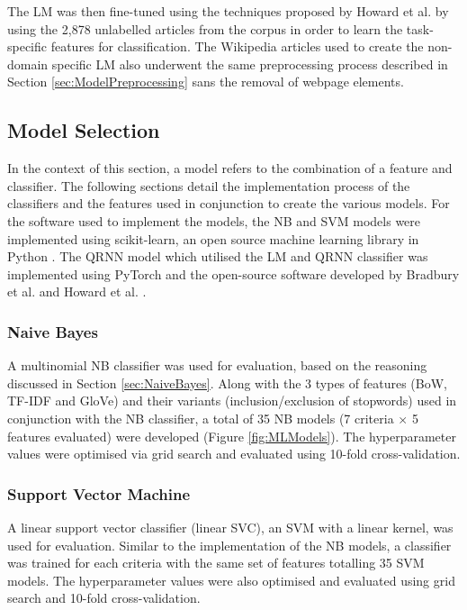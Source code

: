 \documentclass[a4paper,twoside,phd]{BYUPhys}
\begin{document}
The LM was then fine-tuned using the techniques proposed by Howard et al. \cite{Howard2018} by using the 2,878 unlabelled articles from the corpus in order to learn the task-specific features for classification. The Wikipedia articles used to create the non-domain specific LM also underwent the same preprocessing process described in Section \ref{sec:ModelPreprocessing} sans the removal of webpage elements. 

\subsection{Model Selection}
\label{sec:ModelSelection}

In the context of this section, a model refers to the combination of a feature and classifier. The following sections detail the implementation process of the classifiers and the features used in conjunction to create the various models.
For the software used to implement the models, the NB and SVM models were implemented using scikit-learn, an open source machine learning library in Python \cite{scikit-learn}. The QRNN model which utilised the LM and QRNN classifier was implemented using PyTorch \cite{paszke2017automatic} and the open-source software developed by Bradbury et al. \cite{bradbury2016quasi} and Howard et al. \cite{Howard2018}. 

\subsubsection{Naive Bayes}
\label{sec:ModelNB}

A multinomial NB classifier was used for evaluation, based on the reasoning discussed in Section \ref{sec:NaiveBayes}. Along with the 3 types of features (BoW, TF-IDF and GloVe) and their variants (inclusion/exclusion of stopwords) used in conjunction with the NB classifier, a total of 35 NB models (7 criteria $\times$ 5 features evaluated) were developed (Figure \ref{fig:MLModels}). The hyperparameter values were optimised via grid search and evaluated using 10-fold cross-validation. 

\subsubsection{Support Vector Machine}
\label{sec:ModelSVM}

A linear support vector classifier (linear SVC), an SVM with a linear kernel, was used for evaluation. Similar to the implementation of the NB models, a classifier was trained for each criteria with the same set of features totalling 35 SVM models. The hyperparameter values were also optimised and evaluated using grid search and 10-fold cross-validation.
\end{document}
